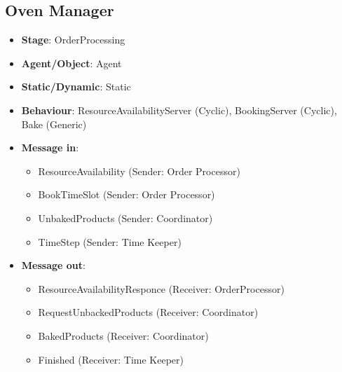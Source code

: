\documentclass[12pt]{article}
\begin{document}
\subsection{Oven Manager}%
\label{sub:over_manager}
\begin{itemize}
    \item \textbf{Stage}: OrderProcessing
    \item \textbf{Agent/Object}: Agent
    \item \textbf{Static/Dynamic}: Static
    \item \textbf{Behaviour}: ResourceAvailabilityServer (Cyclic), BookingServer (Cyclic), Bake (Generic)
    \item \textbf{Message in}:
        \begin{itemize}
            \item ResourceAvailability (Sender: Order Processor)
            \item BookTimeSlot (Sender: Order Processor)
            \item UnbakedProducts (Sender: Coordinator)
            \item TimeStep (Sender: Time Keeper)
        \end{itemize}
    \item \textbf{Message out}:
        \begin{itemize}
            \item ResourceAvailabilityResponce (Receiver: OrderProcessor)
            \item RequestUnbackedProducts (Receiver: Coordinator)
            \item BakedProducts (Receiver: Coordinator)
            \item Finished (Receiver: Time Keeper)
        \end{itemize}
\end{itemize}

\newpage{}
\end{document}
